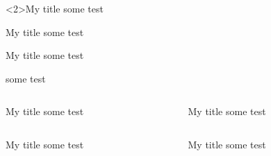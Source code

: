 \documentclass[
]{beamer}
\begin{document}
    
\begin{frame}[t]
  \begin{block}<2>{My title}
  some test
  \end{block}  

  \begin{alertblock}{My title}
  some test
  \end{alertblock}  
  
  \begin{exampleblock}{My title}
  some test
  \end{exampleblock}      
  
  \begin{theorem}[Quack]
  some test
  \end{theorem}        


\begin{columns}[onlytextwidth]
\begin{column}{.4\textwidth}
  \begin{block}{My title}
  some test
  \end{block}  
\end{column}
\begin{column}{.4\textwidth}
  \begin{exampleblock}{My title}
  some test
  \end{exampleblock}   
\end{column}
\end{columns}  
\end{frame} 

\begin{frame}
\begin{columns}[onlytextwidth]
\begin{column}{.4\textwidth}
  \begin{block}{My title}
  some test
  \end{block}  
\end{column}
\begin{column}{.4\textwidth}
  \begin{exampleblock}{My title}
  some test
  \end{exampleblock}   
\end{column}
\end{columns}
\end{frame}
\end{document}
